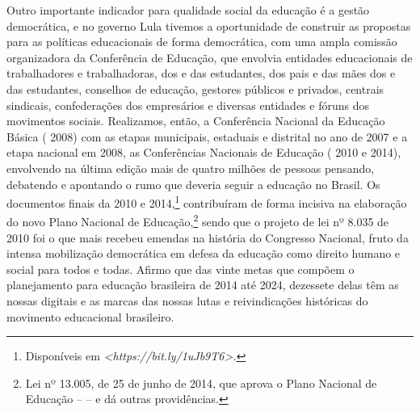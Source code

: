 Outro importante indicador para qualidade social da educação é a gestão
democrática, e no governo Lula tivemos a oportunidade de construir as
propostas para as políticas educacionais de forma democrática, com uma
ampla comissão organizadora da Conferência de Educação, que envolvia
entidades educacionais de trabalhadores e trabalhadoras, dos e das
estudantes, dos pais e das mães dos e das estudantes, conselhos de
educação, gestores públicos e privados, centrais sindicais,
confederações dos empresários e diversas entidades e fóruns dos
movimentos sociais. Realizamos, então, a Conferência Nacional da
Educação Básica ( 2008) com as etapas municipais, estaduais e
distrital no ano de 2007 e a etapa nacional em 2008, as Conferências
Nacionais de Educação ( 2010 e 2014), envolvendo na última edição
mais de quatro milhões de pessoas pensando, debatendo e apontando o rumo
que deveria seguir a educação no Brasil. Os documentos finais da 
2010 e 2014,\footnote{Disponíveis em \emph{\textless{}https://bit.ly/1uJb9T6\textgreater{}.}}
contribuíram de forma incisiva na elaboração do novo Plano Nacional de
Educação,\footnote{Lei nº 13.005, de 25 de junho de 2014, que aprova
  o Plano Nacional de Educação --  -- e dá outras providências.} sendo que o
projeto de lei nº 8.035 de 2010 foi o que mais recebeu emendas
na história do Congresso Nacional, fruto da intensa mobilização
democrática em defesa da educação como direito humano e social para
todos e todas. Afirmo que das vinte metas que compõem o planejamento
para educação brasileira de 2014 até 2024, dezessete delas têm as nossas
digitais e as marcas das nossas lutas e reivindicações históricas do
movimento educacional brasileiro.


